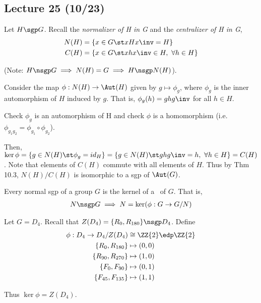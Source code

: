 \subsection*{Lecture 25 (10/23)} %

\begin{example}[N/C Theorem] Let \(H\sgp G\). Recall the \emph{normalizer of H in G} and the \emph{centralizer of H in G}, \begin{align*}
    N(H)&=\{x\in G \st xHx\inv=H\} \\
    C(H)&=\{x\in G \st xhx\inv \in H,\ \forall h\in H\}
\end{align*}

(Note: \(H\nsgp G \implies N(H)=G \implies H\nsgp N(H)\)).

Consider the map \(\phi: N(H)\to \Aut(H)\) given by \(g\mapsto \phi_g\), where \(\phi_g\) is the inner automorphism of \(H\) induced by \(g\). That is, \(\phi_g(h)=ghg\inv \) for all \(h\in H\).\\

\begin{exercise}
    Check \(\phi_g\) is an automorphism of H and check \(\phi\) is a homomorphism (i.e. \(\phi_{g_1g_2}=\phi_{g_1}\circ\phi_{g_2}\)).
\end{exercise}

Then, \(\ker\phi = \{g\in N(H) \st \phi_g=id_H\} = \{g\in N(H) \st ghg\inv=h,\ \forall h\in H\}= C(H)\). Note that elements of \(C(H)\) commute with all elements of \(H\). Thus by Thm 10.3, \(N(H)/C(H)\) is isomorphic to a sgp of \(\Aut(G)\).
\end{example}

\begin{theorem}
    Every normal sgp of a group \(G\) is the kernel of a \homo\ of \(G\). That is,
    \begin{align*}
        N\nsgp G \implies N = \ker(\phi:G\to G/N)
    \end{align*}
\end{theorem}

\begin{example}
    Let \(G = D_4\). Recall that \(Z(D_4)=\{R_0, R_{180}\}\nsgp D_4\). Define
    \begin{align*}
        \phi: D_4 \to D_4/Z(D_4)&\cong \ZZ{2} \edp \ZZ{2} \\
        \{R_0, R_{180}\}&\mapsto (0,0) \\
        \{R_{90}, R_{270}\}&\mapsto (1,0) \\
        \{F_0, F_{90}\}&\mapsto (0,1) \\
        \{F_{45}, F_{135}\}&\mapsto (1,1) \\
    \end{align*}

    Thus \(\ker\phi = Z(D_4)\).
\end{example}

